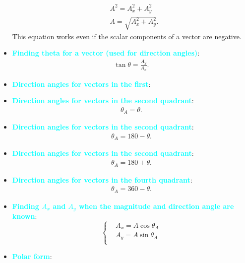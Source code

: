 \documentclass{report}
\begin{document}
\begin{itemize}
\begin{align*}
               &A^{2}  = A_{x}^{2} + A_{y}^{2} \\
               &A = \sqrt{A_{x}^{2} + A_{y}^{2}}
            .\end{align*}
            This equation works even if the scalar components of a vector are negative.
        \item \textbf{\textcolor{cyan}{Finding theta for a vector (used for direction angles)}}:
            \begin{align*}
                \tan{\theta } = \frac{A_{y}}{A_{x}}
            .\end{align*}
        \item \textbf{\textcolor{cyan}{Direction angles for vectors in the first}}:
        \item \textbf{\textcolor{cyan}{Direction angles for vectors in the second quadrant}}:
            \begin{align*}
                \theta_{A} = \theta 
            .\end{align*}
        \item \textbf{\textcolor{cyan}{Direction angles for vectors in the second quadrant}}:
            \begin{align*}
                \theta_{A} = 180 - \theta 
            .\end{align*}
        \item \textbf{\textcolor{cyan}{Direction angles for vectors in the second quadrant}}:
            \begin{align*}
                \theta_{A} = 180 + \theta 
            .\end{align*}
        \item \textbf{\textcolor{cyan}{Direction angles for vectors in the fourth quadrant}}:
            \begin{align*}
                \theta_{A} = 360 - \theta 
            .\end{align*}
        \item \textbf{\textcolor{cyan}{Finding $A_{x}$ and $A_{y}$  when the magnitude and direction angle are known}}:
        \begin{equation}
            \begin{cases}
                &A_{x} = A\cos{\theta_{A}} \\
                &A_{y} = A\sin{\theta_{A}} \\
            \end{cases}
        \end{equation}
        \item \textbf{\textcolor{cyan}{Polar form}}:

\end{itemize}
\end{document}
